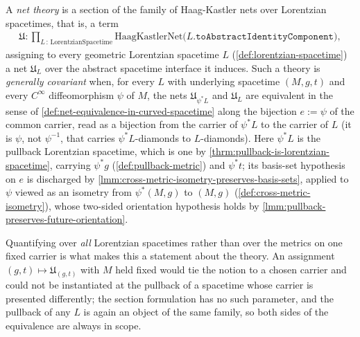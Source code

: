 \begin{definition}
    \label{def:general-covariance-in-curved-spacetime}
    \leanok
    A \emph{net theory} is a section of the family of Haag-Kastler nets over Lorentzian spacetimes, that is, a term
    \begin{align}
        \mathfrak{U} : \prod_{L \,:\, \mathrm{LorentzianSpacetime}} \mathrm{HaagKastlerNet}\big(L.\mathtt{toAbstractIdentityComponent}\big),
    \end{align}
    assigning to every geometric Lorentzian spacetime $L$ (\ref{def:lorentzian-spacetime}) a net $\mathfrak{U}_L$ over the abstract spacetime interface it induces. Such a theory is \emph{generally covariant} when, for every $L$ with underlying spacetime $(M,g,t)$ and every $C^\infty$ diffeomorphism $\psi$ of $M$, the nets $\mathfrak{U}_{\psi^*L}$ and $\mathfrak{U}_L$ are equivalent in the sense of \ref{def:net-equivalence-in-curved-spacetime} along the bijection $e := \psi$ of the common carrier, read as a bijection from the carrier of $\psi^*L$ to the carrier of $L$ (it is $\psi$, not $\psi^{-1}$, that carries $\psi^*L$-diamonds to $L$-diamonds). Here $\psi^*L$ is the pullback Lorentzian spacetime, which is one by \ref{thrm:pullback-is-lorentzian-spacetime}, carrying $\psi^*g$ (\ref{def:pullback-metric}) and $\psi^*t$; its basis-set hypothesis on $e$ is discharged by \ref{lmm:cross-metric-isometry-preserves-basis-sets}, applied to $\psi$ viewed as an isometry from $\psi^*(M,g)$ to $(M,g)$ (\ref{def:cross-metric-isometry}), whose two-sided orientation hypothesis holds by \ref{lmm:pullback-preserves-future-orientation}.

    Quantifying over \emph{all} Lorentzian spacetimes rather than over the metrics on one fixed carrier is what makes this a statement about the theory. An assignment $(g,t) \mapsto \mathfrak{U}_{(g,t)}$ with $M$ held fixed would tie the notion to a chosen carrier and could not be instantiated at the pullback of a spacetime whose carrier is presented differently; the section formulation has no such parameter, and the pullback of any $L$ is again an object of the same family, so both sides of the equivalence are always in scope.
\end{definition}

